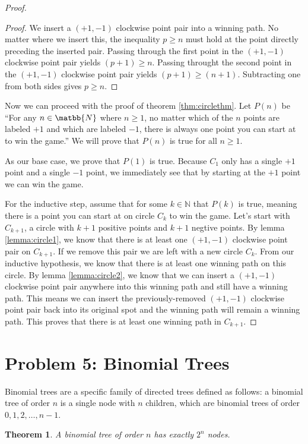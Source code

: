 \documentclass[10pt,letter]{article}
\newtheorem*{thm}{Theorem}
\begin{document}
\begin{proof}
\begin{proof}
We insert a $(+1, -1)$ clockwise point pair into a winning path. No matter where we insert this, the inequality $p \ge n$ must hold at the point directly preceding the inserted pair. Passing through the first point in the $(+1, -1)$ clockwise point pair yields $(p+1) \ge n$. Passing throught the second point in the $(+1, -1)$ clockwise point pair yields $(p+1) \ge (n+1)$. Subtracting one from both sides gives $p \ge n$.
\end{proof}

Now we can proceed with the proof of theorem \ref{thm:circlethm}. Let $P(n)$ be ``For any $n \in \matbb{N}$ where $n \ge 1$, no matter which of the $n$ points are labeled $+1$ and which are labeled $-1$, there is always one point you can start at to win the game.'' We will prove that $P(n)$ is true for all $n \ge 1$.

As our base case, we prove that $P(1)$ is true. Because $C_1$ only has a single $+1$ point and a single $-1$ point, we immediately see that by starting at the $+1$ point we can win the game.

For the inductive step, assume that for some $k \in \mathbb{N}$ that $P(k)$ is true, meaning there is a point you can start at on circle $C_k$ to win the game. Let's start with $C_{k+1}$, a circle with $k+1$ positive points and $k+1$ negtive points. By lemma \ref{lemma:circle1}, we know that there is at least one $(+1, -1)$ clockwise point pair on $C_{k+1}$. If we remove this pair we are left with a new circle $C_k$. From our inductive hypothesis, we know that there is at least one winning path on this circle. By lemma \ref{lemma:circle2}, we know that we can insert a $(+1, -1)$ clockwise point pair anywhere into this winning path and still have a winning path. This means we can insert the previously-removed $(+1, -1)$ clockwise point pair back into its original spot and the winning path will remain a winning path. This proves that there is at least one winning path in $C_{k+1}$. 
\end{proof}

\section{Problem 5: Binomial Trees}
Binomial trees are a specific family of directed trees defined as follows: a binomial tree of order $n$ is a single node with $n$ children, which are binomial trees of order $0, 1, 2, \ldots, n-1$. 

\begin{thm}
A binomial tree of order $n$ has exactly $2^n$ nodes.
\end{thm}
\end{document}
